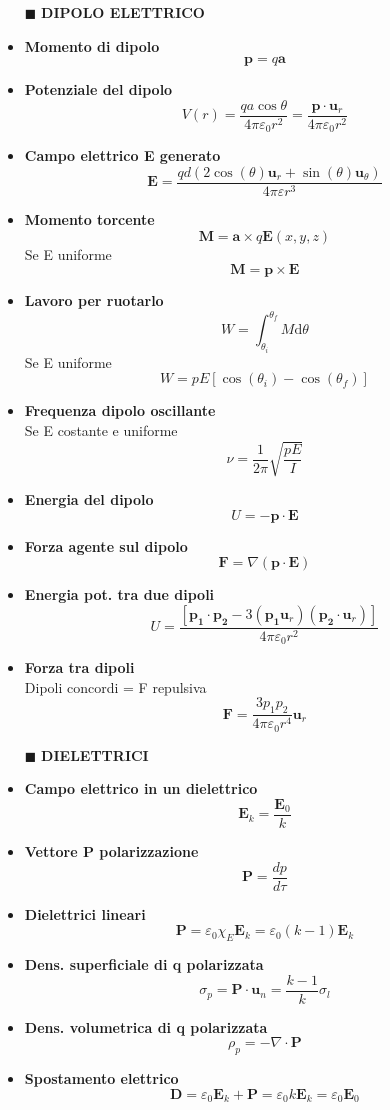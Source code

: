 \documentclass{book}
\newcommand{\g}{\textbf}
\newcommand{\h}{\mathbf}
\newcommand{\e}{\begin{equation}}
\newcommand{\ex}{\end{equation} }
\renewcommand{\it}{\item[$\cdot$]}
\begin{document}
\begin{multicols}{4}
\begin{itemize}
\hline
\item [$\blacksquare$] \g{DIPOLO ELETTRICO}
    \it \g{Momento di dipolo}
        \e{\h{p}=q \h{a}} \ex
    \it \g{Potenziale del dipolo}
        \e{V(r)=\frac{qa\cos{\theta}}{4\pi\varepsilon_0 r^2}=\frac{\h{p}\cdot\h{u}_r}{4\pi\varepsilon_0 r^2}} \ex
    \it \g{Campo elettrico \g{E} generato}
        \e{\mathbf{E}={\frac{q d\left(2\cos\left(\theta\right)\mathbf{u}_{r}+\sin\left(\theta\right)\mathbf{u}_{\theta}\right)}{4\pi\varepsilon r^{3}}}} \ex
    \it \g{Momento torcente}
        \e{\h{M}=\h{a}\times q\h{E}(x,y,z)} \ex
        Se E uniforme
        \e{\h{M}=\h{p}\times\h{E}} \ex
    \it \g{Lavoro per ruotarlo} 
        \e{W=\int_{\theta_{i}}^{\theta_{f}}M \mathrm{d}\theta} \ex
        Se E uniforme
        \e{W=p E[\cos(\theta_{i})-\cos(\theta_{f})]} \ex
    \it \g{Frequenza dipolo oscillante} \\
        Se E costante e uniforme
        \e{\nu=\frac{1}{2\pi}\sqrt{\frac{pE}{I}}} \ex
    \it \g{Energia del dipolo}
        \e{U=-\h{p}\cdot\h{E}} \ex
    \it \g{Forza agente sul dipolo}
        \e{\h{F}=\nabla(\h{p}\cdot\h{E})} \ex
    \it \g{Energia pot. tra due dipoli}
        \e{U=\frac{[\h{p_1}\cdot\h{p_2}-3(\h{p_1}\h{u}_r)(\h{p_2}\cdot\h{u}_r)]}{4\pi\varepsilon_0r^2}}\ex
    \it \g{Forza tra dipoli}\\
        Dipoli concordi = F repulsiva
        \e{\h{F}=\frac{3p_1p_2}{4\pi\varepsilon_0r^4}\h{u}_r}\ex

\hline
\item [$\blacksquare$] \g{DIELETTRICI}
    \it \g{Campo elettrico in un dielettrico}
        \e{\h{E}_k=\frac{\h{E}_0}{k}} \ex
    \it \g{Vettore P polarizzazione}
        \e{\h{P}=\frac{dp}{d\tau}} \ex
    \it \g{Dielettrici lineari}
        \e{\h{P}=\varepsilon_0\chi_E \h{E}_k=\varepsilon_0(k-1)\h{E}_k} \ex
    \it \g{Dens. superficiale di q polarizzata}
        \e{\sigma_p=\h{P}\cdot\h{u}_n=\frac{k-1}{k}\sigma_l} \ex
    \it \g{Dens. volumetrica di q polarizzata}
        \e{\rho_p=-\nabla\cdot\h{P}} \ex
    \it \g{Spostamento elettrico}
        \e{\h{D}=\varepsilon_0 \h{E}_k+\h{P}=\varepsilon_0 k \h{E}_k=\varepsilon_0 \h{E}_0} \ex


\end{itemize}
\end{multicols}
\end{document}
